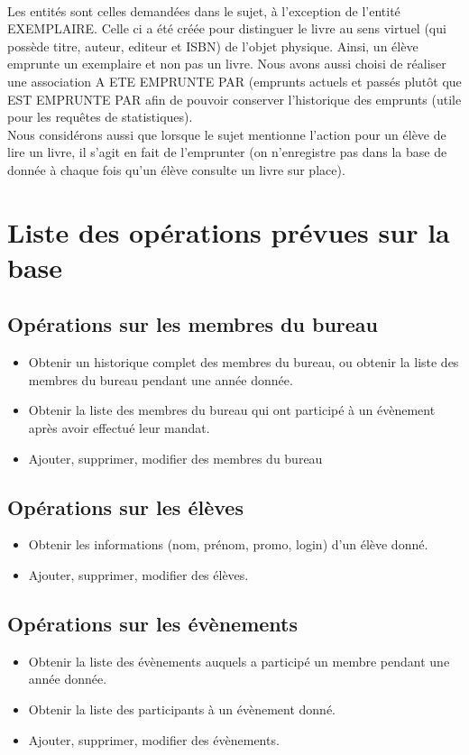 \documentclass[a4paper, 11pt]{article}
\begin{document}
\paragraph{}
Les entités sont celles demandées dans le sujet, à l'exception de l'entité EXEMPLAIRE. Celle ci a été créée pour distinguer le livre au sens virtuel (qui possède titre, auteur, editeur et ISBN) de l'objet physique. Ainsi, un élève emprunte un exemplaire et non pas un livre. Nous avons aussi choisi de réaliser une association A ETE EMPRUNTE PAR (emprunts actuels et passés plut\^ot que EST EMPRUNTE PAR afin de pouvoir conserver l'historique des emprunts (utile pour les requ\^etes de statistiques).\\
Nous considérons aussi que lorsque le sujet mentionne l'action pour un élève de lire un livre, il s'agit en fait de l'emprunter (on n'enregistre pas dans la base de donnée à chaque fois qu'un élève consulte un livre sur place). 
\section{Liste des opérations prévues sur la base}
\subsection{Opérations sur les membres du bureau}
\begin{itemize}
\item Obtenir un historique complet des membres du bureau, ou obtenir la liste des membres du bureau pendant une année donnée.
\item Obtenir la liste des membres du bureau qui ont participé à un évènement après avoir effectué leur mandat.
\item Ajouter, supprimer, modifier des membres du bureau
\end{itemize}
\subsection{Opérations sur les élèves}
\begin{itemize}
\item Obtenir les informations (nom, prénom, promo, login) d'un élève donné.
\item Ajouter, supprimer, modifier des élèves.
\end{itemize}
\subsection{Opérations sur les évènements}
\begin{itemize}
\item Obtenir la liste des évènements auquels a participé un membre pendant une année donnée.
\item Obtenir la liste des participants à un évènement donné.
\item Ajouter, supprimer, modifier des évènements.
\end{itemize}
\end{document}
